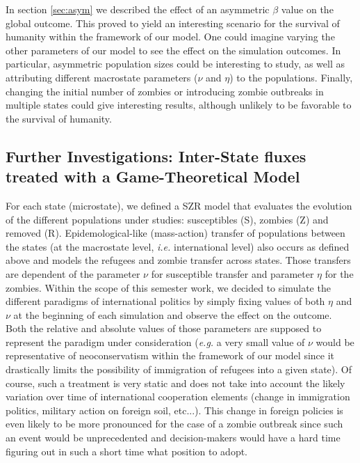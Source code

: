 \documentclass[11pt]{article} %
\begin{document}
In section \ref{sec:asym} we described the effect of an asymmetric $\beta$ value on the global outcome. This proved to yield an interesting scenario for the survival of humanity within the framework of our model. One could imagine varying the other parameters of our model to see the effect on the simulation outcomes. In particular, asymmetric population sizes could be interesting to study, as well as attributing different macrostate parameters ($\nu$ and $\eta$) to the populations. Finally, changing the initial number of zombies or introducing zombie outbreaks in multiple states could give interesting results, although unlikely to be favorable to the survival of humanity.

\subsection{Further Investigations: Inter-State fluxes treated with a Game-Theoretical Model}\indent
\label{sec:gt}

For each state (microstate), we defined a SZR model that evaluates the evolution of the different populations under studies: susceptibles (S), zombies (Z) and removed (R). Epidemological-like (mass-action) transfer of populations between the states (at the macrostate level, \textit{i.e.} international level) also occurs as defined above and models the refugees and zombie transfer across states. Those transfers are dependent of the parameter $\nu$ for susceptible transfer and parameter $\eta$ for the zombies. Within the scope of this semester work, we decided to simulate the different paradigms of international politics by simply fixing values of both $\eta$ and $\nu$ at the beginning of each simulation and observe the effect on the outcome. Both the relative and absolute values of those parameters are supposed to represent the paradigm under consideration (\textit{e.g.} a very small value of $\nu$ would be representative of neoconservatism within the framework of our model since it drastically limits the possibility of immigration of refugees into a given state). Of course, such a treatment is very static and does not take into account the likely variation over time of  international cooperation elements (change in immigration politics, military action on foreign soil, etc...). This change in foreign policies is even likely to be more pronounced for the case of a zombie outbreak since such an event would be unprecedented and decision-makers would have a hard time figuring out in such a short time what position to adopt. 
\end{document}
